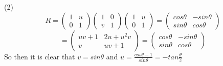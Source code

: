 \documentclass[12pt]{article}
\begin{document}
\medskip
(2)
$$R = \begin{pmatrix}
1 & u \\ 0 & 1
\end{pmatrix} \begin{pmatrix}
1 & 0 \\ v & 1
\end{pmatrix}\begin{pmatrix}
1 & u \\ 0 & 1
\end{pmatrix} = \begin{pmatrix}
cos \theta & -sin \theta \\ sin \theta & cos \theta
\end{pmatrix}$$
$$ = \begin{pmatrix}
uv +1 & 2u + u^2v \\ v & uv +1
\end{pmatrix}= \begin{pmatrix}
cos \theta & -sin \theta \\ sin \theta & cos \theta
\end{pmatrix}$$
So then it is clear that $v = sin\theta$ and $u = \frac{cos\theta - 1}{sin \theta} = -tan \frac{\theta}{2}$
\end{document}

